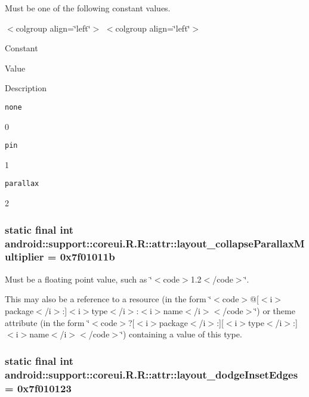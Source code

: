 Must be one of the following constant values. \begin{TabularC}{0}
\hline
\end{TabularC}
$<$colgroup align=\char`\"{}left\char`\"{}$>$ $<$colgroup align=\char`\"{}left\char`\"{}$>$ 

Constant

Value

Description 

{\tt none}

0

{\tt pin}

1

{\tt parallax}

2\hypertarget{classandroid_1_1support_1_1coreui_1_1_r_1_1attr_a2708386c42a5e2cb2478b80c36fbd74}{
\subsubsection[{layout\_\-collapseParallaxMultiplier}]{\setlength{\rightskip}{0pt plus 5cm}static final int android::support::coreui.R.R::attr::layout\_\-collapseParallaxMultiplier = 0x7f01011b}}
\label{classandroid_1_1support_1_1coreui_1_1_r_1_1attr_a2708386c42a5e2cb2478b80c36fbd74}


Must be a floating point value, such as \char`\"{}$<$code$>$1.2$<$/code$>$\char`\"{}. 

This may also be a reference to a resource (in the form \char`\"{}$<$code$>$@\mbox{[}$<$i$>$package$<$/i$>$:\mbox{]}$<$i$>$type$<$/i$>$:$<$i$>$name$<$/i$>$$<$/code$>$\char`\"{}) or theme attribute (in the form \char`\"{}$<$code$>$?\mbox{[}$<$i$>$package$<$/i$>$:\mbox{]}\mbox{[}$<$i$>$type$<$/i$>$:\mbox{]}$<$i$>$name$<$/i$>$$<$/code$>$\char`\"{}) containing a value of this type. \hypertarget{classandroid_1_1support_1_1coreui_1_1_r_1_1attr_7d167390994b83dde5cf44051e633066}{
\subsubsection[{layout\_\-dodgeInsetEdges}]{\setlength{\rightskip}{0pt plus 5cm}static final int android::support::coreui.R.R::attr::layout\_\-dodgeInsetEdges = 0x7f010123}}
\label{classandroid_1_1support_1_1coreui_1_1_r_1_1attr_7d167390994b83dde5cf44051e633066}


